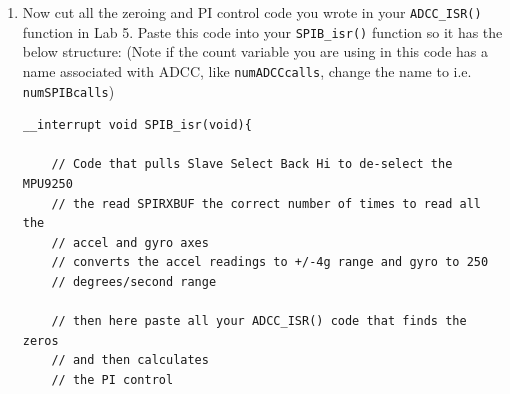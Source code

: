 \documentclass[11pt]{article}
\begin{document}
\begin{enumerate}
\begin{verbatim}
    //!!!!!!!!!!!!!!!!!!!! SPIB start transmission code
    //Paste your code copied from HW#3 timer interrupt that first
    // pulls Slave Select Low and then
    //writes to SPITXBUF the correct number of 16bit words to
    // communicate with the MPU-9250
    //!!!!!!!!!!!!!!!!!!!!

    //!!!!!!!!!!!!!!!!!!!
    //Then all your zeroing and PI control code will be here for
    // this step only. In the next step
    // you will be cutting this code from here and moving it to the
    // SPIB_isr().
    //!!!!!!!!!!!!!!!!!!
    AdccRegs.ADCINTFLGCLR.bit.ADCINT1 = 1; //clear interrupt flag
    PieCtrlRegs.PIEACK.all = PIEACK_GROUP1;
}
\end{verbatim}
        \item Now cut all the zeroing and PI control code you wrote in your \texttt{ADCC_ISR()} function in Lab 5. Paste this code into your \texttt{SPIB_isr()} function so it has the below structure: (Note if the count variable you are using in this code has a name associated with ADCC, like \texttt{numADCCcalls}, change the name to i.e. \texttt{numSPIBcalls})
\begin{verbatim}
__interrupt void SPIB_isr(void){

    // Code that pulls Slave Select Back Hi to de-select the MPU9250
    // the read SPIRXBUF the correct number of times to read all the
    // accel and gyro axes
    // converts the accel readings to +/-4g range and gyro to 250
    // degrees/second range

    // then here paste all your ADCC_ISR() code that finds the zeros
    // and then calculates
    // the PI control


\end{verbatim}
\end{enumerate}
\end{document}
